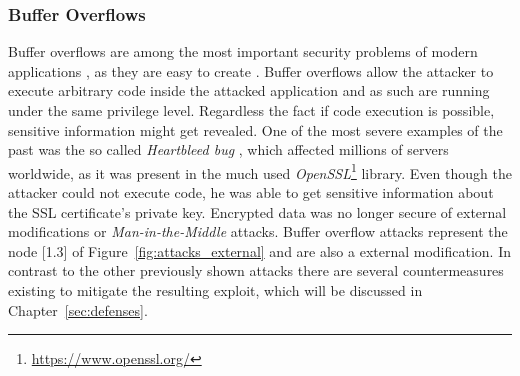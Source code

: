 \subsubsection{Buffer Overflows}
Buffer overflows are among the most important security problems of modern applications \cite{pethia}, as they are easy to create \cite{bufferoverflows_easy}. Buffer overflows allow the attacker to execute arbitrary code inside the attacked application and as such are running under the same privilege level. Regardless the fact if code execution is possible, sensitive information might get revealed. One of the most severe examples of the past was the so called \emph{Heartbleed bug} \cite{durumeri}, which affected millions of servers worldwide, as it was present in the much used \emph{OpenSSL}\footnote{\url{https://www.openssl.org/}} library. Even though the attacker could not execute code, he was able to get sensitive information about the SSL certificate's private key. Encrypted data was no longer secure of external modifications or \emph{Man-in-the-Middle} attacks. Buffer overflow attacks represent the node [1.3] of Figure~\ref{fig:attacks_external} and are also a external modification. In contrast to the other previously shown attacks there are several countermeasures existing to mitigate the resulting exploit, which will be discussed in Chapter~\ref{sec:defenses}.